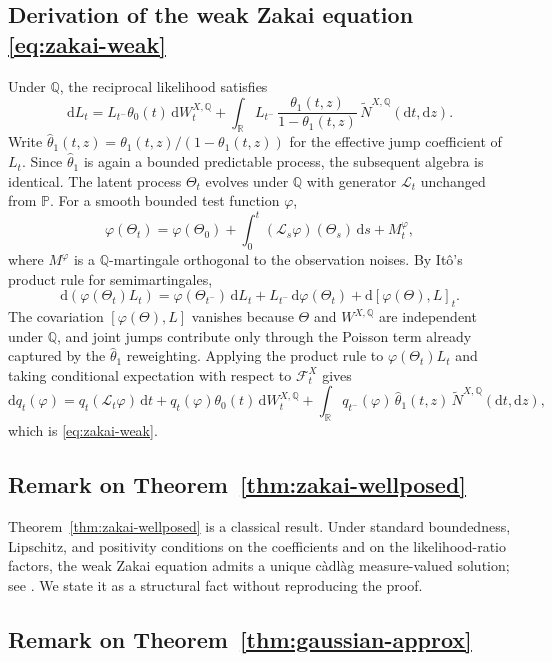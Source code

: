 \documentclass{article}
\newcommand{\dd}{\mathrm{d}}
\begin{document}
\subsection{Derivation of the weak Zakai equation \eqref{eq:zakai-weak}}\label{app:zakai}
Under \(\mathbb Q\), the reciprocal likelihood satisfies
\[
\dd L_t = L_{t^-}\theta_0(t)\,\dd W_t^{X,\mathbb Q} + \int_{\mathbb R} L_{t^-}\,\frac{\theta_1(t,z)}{1-\theta_1(t,z)}\,\widetilde N^{X,\mathbb Q}(\dd t,\dd z).
\]
Write \(\hat{\theta}_1(t,z) = \theta_1(t,z)/(1-\theta_1(t,z))\) for the effective jump coefficient of \(L_t\). Since \(\hat{\theta}_1\) is again a bounded predictable process, the subsequent algebra is identical. The latent process \(\Theta_t\) evolves under \(\mathbb Q\) with generator \(\mathcal L_t\) unchanged from \(\mathbb P\). For a smooth bounded test function \(\varphi\),
\[
\varphi(\Theta_t) = \varphi(\Theta_0) + \int_0^t (\mathcal L_s\varphi)(\Theta_s)\,\dd s + M_t^\varphi,
\]
where \(M^\varphi\) is a \(\mathbb Q\)-martingale orthogonal to the observation noises. By It\^o's product rule for semimartingales,
\[
\dd(\varphi(\Theta_t)L_t) = \varphi(\Theta_{t^-})\,\dd L_t + L_{t^-}\,\dd\varphi(\Theta_t) + \dd[\varphi(\Theta),L]_t.
\]
The covariation \([\varphi(\Theta),L]\) vanishes because \(\Theta\) and \(W^{X,\mathbb{Q}}\) are independent under \(\mathbb{Q}\), and joint jumps contribute only through the Poisson term already captured by the \(\hat{\theta}_1\) reweighting. Applying the product rule to \(\varphi(\Theta_t)L_t\) and taking conditional expectation with respect to \(\mathcal F_t^X\) gives
\[
\dd q_t(\varphi) = q_t(\mathcal L_t\varphi)\,\dd t + q_t(\varphi)\theta_0(t)\,\dd W_t^{X,\mathbb Q}
+ \int_{\mathbb R} q_{t^-}(\varphi)\,\hat{\theta}_1(t,z)\,\widetilde N^{X,\mathbb Q}(\dd t,\dd z),
\]
which is \eqref{eq:zakai-weak}.

\subsection{Remark on Theorem~\ref{thm:zakai-wellposed}}\label{app:remark-wellposed}

Theorem~\ref{thm:zakai-wellposed} is a classical result. Under standard boundedness, Lipschitz, and positivity conditions on the coefficients and on the likelihood-ratio factors, the weak Zakai equation admits a unique c\`adl\`ag measure-valued solution; see \citet{KurtzOcone1988FilteredMP,CeciColaneri2014ZakaiJumps}. We state it as a structural fact without reproducing the proof.

\subsection{Remark on Theorem~\ref{thm:gaussian-approx}}\label{app:remark-gauss}
\end{document}
